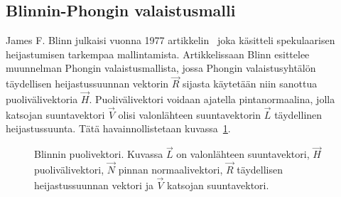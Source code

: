 \documentclass[finnish]{tktltiki2}
\theoremstyle{definition}
\theoremstyle{remark}
\begin{document}
\subsection{Blinnin-Phongin valaistusmalli}
James F. Blinn julkaisi vuonna 1977 artikkelin~\cite{Blinn} joka käsitteli spekulaarisen heijastumisen tarkempaa mallintamista. Artikkelissaan Blinn esittelee muunnelman Phongin valaistusmallista, jossa Phongin valaistusyhtälön täydellisen heijastussuunnan vektorin $\vec{R}$ sijasta käytetään niin sanottua puolivälivektoria $\vec{H}$. Puolivälivektori voidaan ajatella pintanormaalina, jolla katsojan suuntavektori $\vec{V}$ olisi valonlähteen suuntavektorin $\vec{L}$ täydellinen heijastussuunta. Tätä havainnollistetaan kuvassa~\ref{fig:Blinn}.
\begin{figure}[h]
\centering
{}
\caption{Blinnin puolivektori. Kuvassa $\vec{L}$ on valonlähteen suuntavektori, $\vec{H}$ puolivälivektori, $\vec{N}$ pinnan normaalivektori, $\vec{R}$ täydellisen heijastussuunnan vektori ja $\vec{V}$ katsojan suuntavektori.}
\label{fig:Blinn}
\end{figure}
\end{document}

